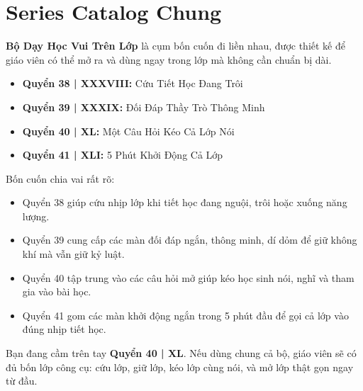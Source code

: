 \chapter*{Series Catalog Chung}

\textbf{Bộ Dạy Học Vui Trên Lớp} là cụm bốn cuốn đi liền nhau, được thiết kế để giáo viên có thể mở ra và dùng ngay trong lớp mà không cần chuẩn bị dài.

\begin{itemize}
\item \textbf{Quyển 38 | XXXVIII:} Cứu Tiết Học Đang Trôi
\item \textbf{Quyển 39 | XXXIX:} Đối Đáp Thầy Trò Thông Minh
\item \textbf{Quyển 40 | XL:} Một Câu Hỏi Kéo Cả Lớp Nói
\item \textbf{Quyển 41 | XLI:} 5 Phút Khởi Động Cả Lớp
\end{itemize}

Bốn cuốn chia vai rất rõ:

\begin{itemize}
\item Quyển 38 giúp cứu nhịp lớp khi tiết học đang nguội, trôi hoặc xuống năng lượng.
\item Quyển 39 cung cấp các màn đối đáp ngắn, thông minh, dí dỏm để giữ không khí mà vẫn giữ kỷ luật.
\item Quyển 40 tập trung vào các câu hỏi mở giúp kéo học sinh nói, nghĩ và tham gia vào bài học.
\item Quyển 41 gom các màn khởi động ngắn trong 5 phút đầu để gọi cả lớp vào đúng nhịp tiết học.
\end{itemize}

Bạn đang cầm trên tay \textbf{Quyển 40 | XL}. Nếu dùng chung cả bộ, giáo viên sẽ có đủ bốn lớp công cụ: cứu lớp, giữ lớp, kéo lớp cùng nói, và mở lớp thật gọn ngay từ đầu.

